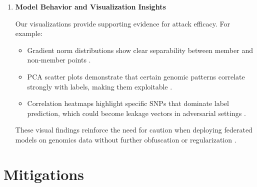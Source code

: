 \documentclass[conference]{IEEEtran}
\begin{document}
\begin{enumerate}
    \item \textbf{Model Behavior and Visualization Insights}
    
    Our visualizations provide supporting evidence for attack efficacy. For example:
    \begin{itemize}
        \item Gradient norm distributions show clear separability between member and non-member points \cite{Wang2023GBMIAGM37}.
	    \item PCA scatter plots demonstrate that certain genomic patterns correlate strongly with labels, making them exploitable \cite{federated2024learning12}.
	    \item Correlation heatmaps highlight specific SNPs that dominate label prediction, which could become leakage vectors in adversarial settings \cite{Yin2021comprehensive9}.
    \end{itemize}
    These visual findings reinforce the need for caution when deploying federated models on genomics data without further obfuscation or regularization \cite{shukla2024federated44}.


\end{enumerate}

\section{Mitigations}
\end{document}
